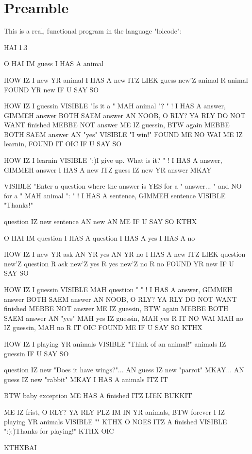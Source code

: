 \documentclass{42-en}
\begin{document}
\chapter{Preamble}

This is a real, functional program in the language "lolcode":

\begin{42console}
HAI 1.3

O HAI IM guess
	I HAS A animal

	HOW IZ I new YR animal
		I HAS A new ITZ LIEK guess
		new'Z animal R animal
		FOUND YR new
	IF U SAY SO

	HOW IZ I guessin
		VISIBLE "Is it a " MAH animal "? " !
		I HAS A answer, GIMMEH answer
		BOTH SAEM answer AN NOOB, O RLY?
		YA RLY
			DO NOT WANT finished
		MEBBE NOT answer
			ME IZ guessin, BTW again
		MEBBE BOTH SAEM answer AN "yes"
			VISIBLE "I win!"
			FOUND ME
		NO WAI
			ME IZ learnin, FOUND IT
		OIC
	IF U SAY SO

	HOW IZ I learnin
		VISIBLE ":)I give up. What is it? " !
		I HAS A answer, GIMMEH answer
		I HAS A new ITZ guess IZ new YR answer MKAY
		
		VISIBLE "Enter a question where the answer is YES for a " answer...
			" and NO for a " MAH animal ": " !
		I HAS A sentence, GIMMEH sentence
		VISIBLE "Thanks!"

		question IZ new sentence AN new AN ME
	IF U SAY SO
KTHX

O HAI IM question
	I HAS A question
	I HAS A yes
	I HAS A no

	HOW IZ I new YR ask AN YR yes AN YR no
		I HAS A new ITZ LIEK question
		new'Z question R ask
		new'Z yes R yes
		new'Z no R no
		FOUND YR new
	IF U SAY SO

	HOW IZ I guessin
		VISIBLE MAH question " " !
		I HAS A answer, GIMMEH answer
		BOTH SAEM answer AN NOOB, O RLY?
		YA RLY
			DO NOT WANT finished
		MEBBE NOT answer
			ME IZ guessin, BTW again
		MEBBE BOTH SAEM answer AN "yes"
			MAH yes IZ guessin, MAH yes R IT
		NO WAI
			MAH no IZ guessin, MAH no R IT
		OIC
		FOUND ME
	IF U SAY SO
KTHX

HOW IZ I playing YR animals
	VISIBLE "Think of an animal!"
	animals IZ guessin
IF U SAY SO

question IZ new "Does it have wings?"...
	AN guess IZ new "parrot" MKAY...
	AN guess IZ new "rabbit" MKAY
I HAS A animals ITZ IT

BTW baby exception
ME HAS A finished ITZ LIEK BUKKIT

ME IZ frist, O RLY?
YA RLY
	PLZ
		IM IN YR animals, BTW forever
			I IZ playing YR animals
			VISIBLE ""
		KTHX
	O NOES ITZ A finished
		VISIBLE ":):)Thanks for playing!"
	KTHX
OIC

KTHXBAI
\end{42console}
\end{document}
